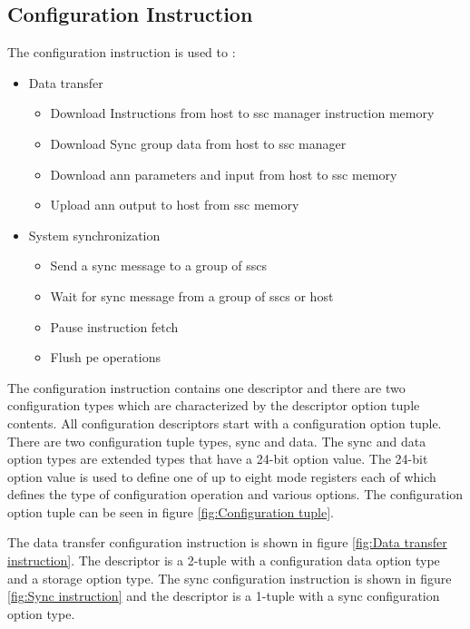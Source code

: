 \subsection{Configuration Instruction}
\label{sec:Configuration Instruction}

The configuration instruction is used to :
\begin{itemize}
  \lbbcleanspace
    \item Data transfer
    \begin{itemize}
      \item Download Instructions from host to \ac{ssc} manager instruction memory
      \item Download Sync group data from host to \ac{ssc} manager 
      \item Download \ac{ann} parameters and input from host to \ac{ssc} memory
      \item Upload \ac{ann} output to host from \ac{ssc} memory
    \end{itemize}
  \item System synchronization
    \begin{itemize}
      \item Send a sync message to a group of \acp{ssc}
      \item Wait for sync message from a group of \acp{ssc} or host
      \item Pause instruction fetch
      \item Flush \ac{pe} operations
    \end{itemize}
\end{itemize}

The configuration instruction contains one descriptor and there are two configuration types which are characterized by the descriptor option tuple contents.
All configuration descriptors start with a configuration option tuple. There are two configuration tuple types, sync and data.
The sync and data option types are extended types that have a 24-bit option value.
The 24-bit option value is used to define one of up to eight mode registers each of which defines the type of configuration operation and various options.
The configuration option tuple can be seen in figure \ref{fig:Configuration tuple}.

The data transfer configuration instruction is shown in figure \ref{fig:Data transfer instruction}. The descriptor is a 2-tuple with a configuration data option type and a storage option type.
The sync configuration instruction is shown in figure \ref{fig:Sync instruction} and the descriptor is a 1-tuple with a sync configuration option type.

